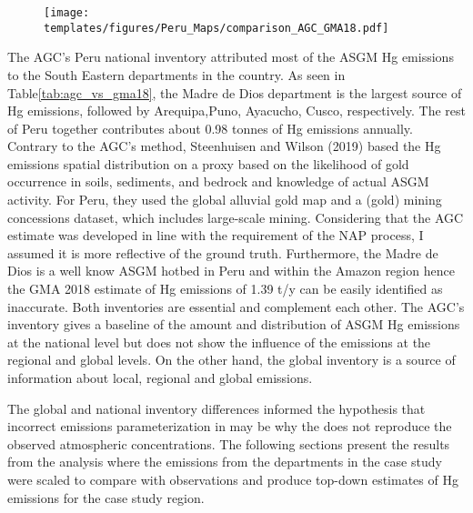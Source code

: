 \begin{figure}[H]
\centering
  \texttt{[image: templates/figures/Peru\_Maps/comparison\_AGC\_GMA18.pdf]}  

\label{fig:agc_vs_gma18}
\end{figure}
\FloatBarrier
\begin{flushleft}
The AGC's Peru national inventory attributed most of the ASGM Hg emissions to the South Eastern departments in the country\cite{agc_reporte_2017}. As seen in Table\ref{tab:agc_vs_gma18}, the Madre de Dios department is the largest source of Hg emissions, followed by Arequipa,Puno, Ayacucho, Cusco, respectively. The rest of Peru together contributes about 0.98 tonnes of Hg emissions annually. Contrary to the AGC's method, Steenhuisen and Wilson (2019) based the Hg emissions spatial distribution on a proxy based on the likelihood of gold occurrence in soils, sediments, and bedrock and knowledge of actual ASGM activity. For Peru, they used the global alluvial gold map and a (gold) mining concessions dataset, which includes large-scale mining. Considering that the AGC estimate was developed in line with the requirement of the NAP process, I assumed it is more reflective of the ground truth. Furthermore, the Madre de Dios is a well know ASGM hotbed in Peru and within the Amazon region hence the GMA 2018 estimate of Hg emissions of 1.39 t/y can be easily identified as inaccurate. Both inventories are essential and complement each other. The AGC's inventory gives a baseline of the amount and distribution of ASGM Hg emissions at the national level but does not show the influence of the emissions at the regional and global levels. On the other hand, the global inventory is a source of information about local, regional and global emissions. 
\end{flushleft}
\begin{flushleft}
    The global and national inventory differences informed the hypothesis that incorrect emissions parameterization in \gc may be why the \on does not reproduce the observed atmospheric concentrations. The following sections present the results from the analysis where the emissions from the departments in the case study were scaled to compare with observations and produce top-down estimates of Hg emissions for the case study region.
\end{flushleft}
